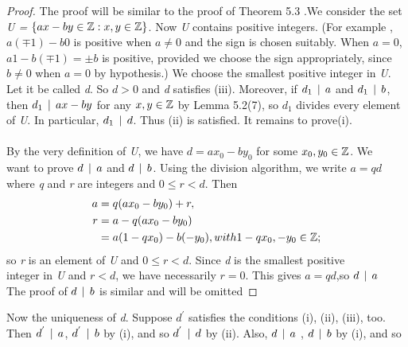 \documentclass{amsbook}
\begin{document}
\begin{proof}
The proof will be similar to the proof of Theorem 5.3 .We consider the set \textit{ U =  $\{ ax - by \in \mathbb{Z} : x,y \in \mathbb{Z}\}$}. Now \textit{U} contains positive integers. (For example , $a(\mp 1) - b0$ is positive when $a \neq 0$ and the 
sign is chosen suitably. When $a =0$, $a1 - b(\mp 1) = \pm b $ is positive, provided we choose the sign appropriately,  since $b \neq 0$ when $ a = 0$ by hypothesis.) We choose the smallest positive integer in \textit{U}. Let it be called \textit{d}. So \textit{$d > 0$} and \textit{d} satisfies (iii). Moreover, if $d_1  \, \mid \,  a$ and $d_1  \, \mid \,  b$,   then $d_1  \, \mid \,  ax-by$ for any $x,y \in \mathbb{Z}$ by Lemma 5.2(7), so $d_1$ divides every element of \textit{U}. In particular, $d_1  \, \mid \,  d$. Thus (ii) is satisfied. It remains to prove(i).\\
\\
\noindent By the very definition of \textit{U}, we have $d = ax_0 - by_0$ for some $x_0,y_0 \in \mathbb{Z}$. We \\ want to prove $d  \, \mid \,  a$ and $d  \, \mid \,  b$. Using the division algorithm, we write \textit{$a = qd $} \\ where \textit{q} and \textit{r} are integers and $0 \leq r < d$. Then \\
    \begin{align*}
        a &= q(ax_0 - by_0) +r,\\ 
        r &= a - q(ax_0 - by_0)\\
        &= a(1 - qx_0) - b(-y_0) ,with  1 - qx_0, -y_0 \in \mathbb{Z};
    \end{align*}
       \bigbreak
\noindent so \textit{r} is an element of \textit{U} and $0 \leq r < d$. Since \textit{d} is the smallest positive \\ integer in \textit{U} and $r < d$, we have necessarily $r = 0$. This gives $a = qd$,so $ d  \, \mid \,  a$ \\ The proof of $d  \, \mid \,  b$ is similar and will be omitted    
\end{proof}
\bigbreak
\noindent Now the uniqueness of \textit{d}. Suppose $ d^{'}$ satisfies the conditions (i), (ii), (iii), too. Then $d^{'}  \, \mid \,  a$, $d^{'}  \, \mid \,  b$ by (i), and so $d^{'}  \, \mid \,  d$ by (ii). Also, $d  \, \mid \,  a$ , $d  \, \mid \,  b$ by (i), and so 
\end{document}
